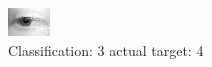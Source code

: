 \begin{figure}[h!]
\begin{center}
\includegraphics[width=0.60\columnwidth]{figures/ID2611_class_3_target_4.png}
\end{center}
\caption{ Classification: 3 actual target: 4}
\label{fig:ID2611_class_3_target_4}
\end{figure}
